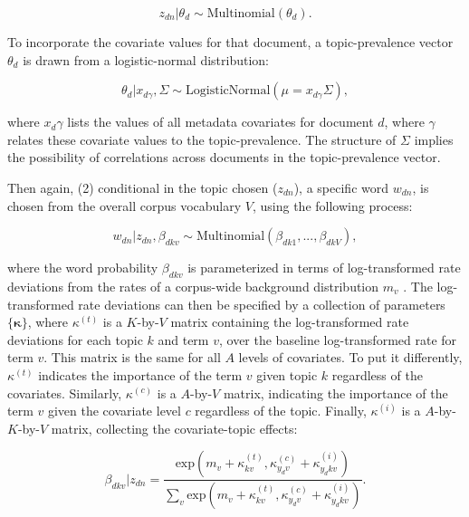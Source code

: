 \documentclass[12pt,a4paper,notitlepage]{article}
\begin{document}
\begin{equation}
	z_{dn}|\theta_d \sim \textrm{Multinomial}(\theta_d).
\end{equation}

To incorporate the covariate values for that document, a topic-prevalence vector $\theta_d$ is drawn from a logistic-normal distribution:

\begin{equation}
	\theta_d|x_{d\gamma},\Sigma \sim \textrm{LogisticNormal}(\mu = x_{d\gamma}\Sigma),
\end{equation}

where $x_d\gamma$ lists the values of all metadata covariates for document $d$, where $\gamma$ relates these covariate values to the topic-prevalence. The structure of $\Sigma$ implies the possibility of correlations across documents in the topic-prevalence vector. 

Then again, (2) conditional in the topic chosen ($z_{dn}$), a specific word $w_{dn}$, is chosen from the overall corpus vocabulary $V$, using the following process:

\begin{equation}
	w_{dn}|z_{dn},\beta_{dkv} \sim \textrm{Multinomial}(\beta_{dk1},...,\beta_{dkV}),
\end{equation}

where the word probability $\beta_{dkv}$ is parameterized in terms of log-transformed rate deviations from the rates of a corpus-wide background distribution $m_v$ \citep{roberts_structural_2013}. The log-transformed rate deviations can then be specified by a collection of parameters $\lbrace \boldsymbol{\kappa} \rbrace$, where $\kappa^{(t)}$ is a $K$-by-$V$ matrix containing the log-transformed rate deviations for each topic $k$ and term $v$, over the baseline log-transformed rate for term $v$. This matrix is the same for all $A$ levels of covariates. To put it differently, $\kappa^{(t)}$ indicates the importance of the term $v$ given topic $k$ regardless of the covariates. Similarly, $\kappa^{(c)}$ is a $A$-by-$V$ matrix, indicating the importance of the term $v$ given the covariate level $c$ regardless of the topic. Finally, $\kappa^{(i)}$ is a $A$-by-$K$-by-$V$ matrix, collecting the covariate-topic effects:

\begin{equation}
	\beta_{dkv}|z_{dn}=\frac{\textrm{exp}(m_v+\kappa^{(t)}_{kv},\kappa^{(c)}_{y_dv}+\kappa^{(i)}_{y_dkv})}{\sum_v \textrm{exp}(m_v+\kappa^{(t)}_{kv},\kappa^{(c)}_{y_dv}+\kappa^{(i)}_{y_dkv})}.
\end{equation}
\end{document}
